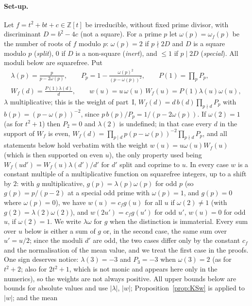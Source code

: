 \documentclass[11pt,a4paper]{article}
\theoremstyle{remark}\newtheorem{remark}[theorem]{Remark}
\newcommand{\Z}{\mathbb{Z}}\newcommand{\Q}{\mathbb{Q}}\newcommand{\F}{\mathbb{F}}\newcommand{\R}{\mathbb{R}}
\begin{document}
\paragraph{Set-up.} Let $f=t^2+bt+c\in\Z[t]$ be irreducible, without fixed prime divisor, with discriminant
$D=b^2-4c$ (not a square). For a prime $p$ let $\omega(p)=\omega_f(p)$ be the number of roots of $f$ modulo $p$:
$\omega(p)=2$ if $p\nmid2D$ and $D$ is a square modulo $p$ (\emph{split}), $0$ if $D$ is a non-square (\emph{inert}),
and $\le1$ if $p\mid2D$ (\emph{special}). All moduli below are squarefree. Put
\[
\begin{gathered}
\lambda(p)=\frac p{p-2\omega(p)},\qquad P_p=1-\frac{\omega(p)^2}{(p-\omega(p))^2},\qquad P(1)=\prod_pP_p,\\
W_f(d)=\frac{P(1)\lambda(d)}d,\qquad w(u)=u\,\omega(u)\,W_f(u)=P(1)\lambda(u)\omega(u),
\end{gathered}
\]
$\lambda$ multiplicative; this is the weight of part~I, $W_f(d)=d\,b(d)\prod_{p\nmid d}P_p$ with $b(p)=(p-\omega(p))^{-2}$,
since $p\,b(p)/P_p=1/(p-2\omega(p))$. If $\omega(2)=1$ (as for $t^2+1$) then $P_2=0$ and $\lambda(2)$ is undefined; in
that case every $d$ in the support of $W_f$ is even, $W_f(d)=\prod_{p\mid d}p(p-\omega(p))^{-2}\prod_{p\nmid d}P_p$, and all
statements below hold verbatim with the weight $w(u)=u\omega(u)W_f(u)$ (which is then supported on even $u$), the only
property used being $W_f(ud')=W_f(u)\lambda(d')/d'$ for $d'$ split and coprime to $u$. In every case $w$ is a constant
multiple of a multiplicative function on squarefree integers, up to a shift by $2$: with $g$ multiplicative,
$g(p)=\lambda(p)\omega(p)$ for odd $p$ (so $g(p)=p/(p-2)$ at a special odd prime with $\omega(p)=1$, and $g(p)=0$ where $\omega(p)=0$),
we have $w(u)=c_fg(u)$ for all $u$ if $\omega(2)\ne1$ (with $g(2)=\lambda(2)\omega(2)$), and $w(2u')=c_fg(u')$ for odd $u'$,
$w(u)=0$ for odd $u$, if $\omega(2)=1$. We write $\lambda\omega$ for $g$ when the distinction is immaterial. Every sum over $u$
below is either a sum of $g$ or, in the second case, the same sum over $u'=u/2$; since the moduli $d'$ are odd, the
two cases differ only by the constant $c_f$ and the normalisation of the mean value, and we treat the first case in the
proofs. One sign deserves notice: $\lambda(3)=-3$ and $P_3=-3$ when
$\omega(3)=2$ (as for $t^2+2$; also for $2t^2+1$, which is not monic and appears here only in the numerics), so the weights are not always positive. All upper bounds below are
bounds for absolute values and use $|\lambda|$, $|w|$; Proposition~\ref{prop:KSw} is applied to $|w|$; and the mean
\end{document}
